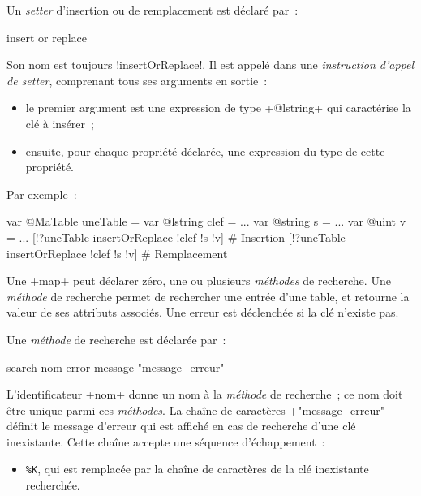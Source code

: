 Un \emph{setter} d'insertion ou de remplacement est déclaré par~:

\begin{galgas3}
insert or replace
\end{galgas3}

Son nom est toujours \ggst!insertOrReplace!. Il est appelé dans une \emph{instruction d'appel de setter}, comprenant tous ses arguments en sortie~:
\begin{itemize}
  \item le premier argument est une expression de type \ggst+@lstring+ qui caractérise la clé à insérer~;
  \item ensuite, pour chaque propriété déclarée, une expression du type de cette propriété.
\end{itemize}

Par exemple~:
\begin{galgas3}
var @MaTable uneTable = {}
var @lstring clef = ...
var @string s = ...
var @uint v = ...
[!?uneTable insertOrReplace !clef !s !v] # Insertion
[!?uneTable insertOrReplace !clef !s !v] # Remplacement
\end{galgas3}









Une \ggst+map+ peut déclarer zéro, une ou plusieurs \emph{méthodes} de recherche. Une \emph{méthode} de recherche permet de rechercher une entrée d'une table, et retourne la valeur de ses attributs associés. Une erreur est déclenchée si la clé n'existe pas.


Une \emph{méthode} de recherche est déclarée par~:


\begin{galgas3}
search nom error message "message_erreur"
\end{galgas3}

L'identificateur \ggst+nom+ donne un nom à la \emph{méthode} de recherche~; ce nom doit être unique parmi ces \emph{méthodes}. La chaîne de caractères \ggst+"message_erreur"+ définit le message d'erreur qui est affiché en cas de recherche d'une clé inexistante. Cette chaîne accepte une séquence d'échappement~:
\begin{itemize}
  \item \texttt{\%K}, qui est remplacée par la chaîne de caractères de la clé inexistante recherchée.
\end{itemize}



